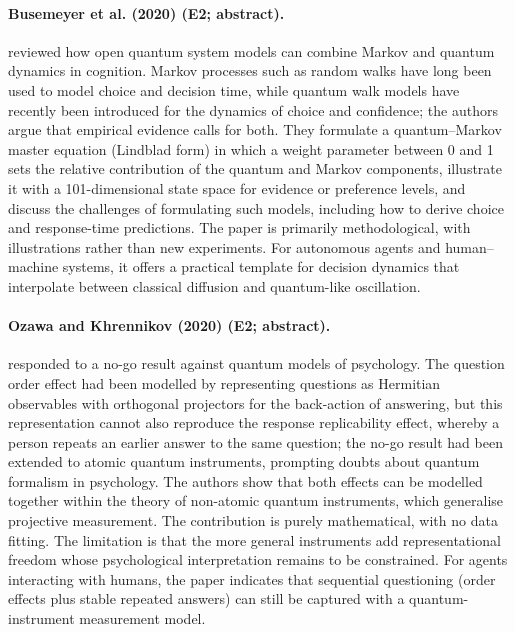 \documentclass[10pt,a4paper]{article}
\begin{document}
\paragraph{Busemeyer et al. (2020) (E2; abstract).} \citet{Busemeyer2020} reviewed how open quantum system models can combine Markov and quantum dynamics in cognition. Markov processes such as random walks have long been used to model choice and decision time, while quantum walk models have recently been introduced for the dynamics of choice and confidence; the authors argue that empirical evidence calls for both. They formulate a quantum--Markov master equation (Lindblad form) in which a weight parameter between 0 and 1 sets the relative contribution of the quantum and Markov components, illustrate it with a 101-dimensional state space for evidence or preference levels, and discuss the challenges of formulating such models, including how to derive choice and response-time predictions. The paper is primarily methodological, with illustrations rather than new experiments. For autonomous agents and human--machine systems, it offers a practical template for decision dynamics that interpolate between classical diffusion and quantum-like oscillation.

\paragraph{Ozawa and Khrennikov (2020) (E2; abstract).} \citet{Ozawa2020} responded to a no-go result against quantum models of psychology. The question order effect had been modelled by representing questions as Hermitian observables with orthogonal projectors for the back-action of answering, but this representation cannot also reproduce the response replicability effect, whereby a person repeats an earlier answer to the same question; the no-go result had been extended to atomic quantum instruments, prompting doubts about quantum formalism in psychology. The authors show that both effects can be modelled together within the theory of non-atomic quantum instruments, which generalise projective measurement. The contribution is purely mathematical, with no data fitting. The limitation is that the more general instruments add representational freedom whose psychological interpretation remains to be constrained. For agents interacting with humans, the paper indicates that sequential questioning (order effects plus stable repeated answers) can still be captured with a quantum-instrument measurement model.
\end{document}
